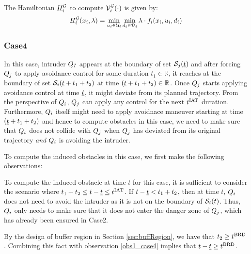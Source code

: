 The Hamiltonian $H^{\mathcal{G}}_{i}$ to compute $\mathcal{V}^{\mathcal{G}}_{i}(\cdot)$ is given by:
\begin{equation} \label{eqn:BRS_obsham}
\ham^{\mathcal{G}}_{i}(\state_i, \costate) = \min_{\ctrl_i \in \cset_i} \min_{\dstb_i \in \dset_i} \costate \cdot f_i (\state_i, \ctrl_i, \dstb_i)
\end{equation}

\subsubsection{Case4} \label{sec:intruderObs_case4}
In this case, intruder $Q_{I}$ appears at the boundary of set $\mathcal{S}_j(\underline{t})$ and after forcing $Q_j$ to apply avoidance control for some duration $t_1 \in \mathbb{R}$, it reaches at the boundary of set $\mathcal{S}_i(\underline{t} + t_1 + t_2)$ at time $(\underline{t} + t_1 + t_2) \in \mathbb{R}$. Once $Q_j$ starts applying avoidance control at time $\underline{t}$, it might deviate from its planned trajectory. From the perspective of $Q_i$, $Q_j$ can apply any control for the next $t^\text{IAT}$ duration. Furthermore, $Q_i$ itself might need to apply avoidnace maneuver starting at time $(\underline{t} + t_1 + t_2)$ and hence to compute obstacles in this case, we need to make sure that $Q_i$ does not collide with $Q_j$ when $Q_j$ has deviated from its original trajectory \textit{and} $Q_i$ is avoiding the intruder.   

To compute the induced obstacles in this case, we first make the following observations:
\begin{observation} \label{obs1_case4}
To compute the induced obstacle at time $t$ for this case, it is sufficient to consider the scenario where $t_1 + t_2 \leq t - \underline{t} \leq t^\text{IAT}$. If $t - \underline{t} < t_1 + t_2$, then at time $t$, $Q_i$ does not need to avoid the intruder as it is not on the boundary of $\mathcal{S}_i(t)$. Thus, $Q_i$ only needs to make sure that it does not enter the danger zone of $Q_j$, which has already been ensured in Case2. 
\end{observation}
\begin{observation} \label{obs2_case4}
By the design of buffer region in Section \ref{sec:buffRegion}, we have that $t_2 \geq t^\text{BRD}$. Combining this fact with observation \ref{obs1_case4} implies that $t- \underline{t} \geq t^\text{BRD}$.
\end{observation}

